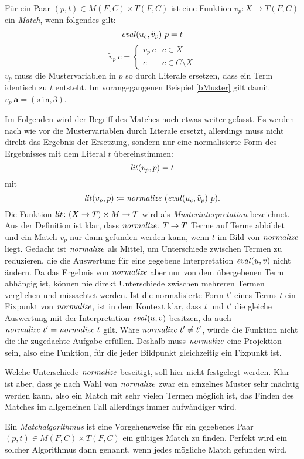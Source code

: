 \begin{definition}~\\ \label{defMatch}
Für ein Paar $(p, t) \in M(F, C) \times T(F, C)$ ist eine Funktion $v_p \colon X \rightarrow T(F, C)$ ein \emph{\Gls{Match}}, wenn folgendes gilt:
$$\mathit{eval}(u_c, \tilde v_p)~ p = t$$
$$\tilde v_p~ c = \begin{cases}
	v_p~ c & c \in X\\
	c      & c \in C \setminus X
\end{cases}$$
$v_p$ muss die Mustervariablen in $p$ so durch Literale ersetzen, dass ein Term identisch zu $t$ entsteht. 
Im vorangegangenen Beispiel \ref{bMuster} gilt damit $v_p~ \mathbf a = (\texttt{sin}, 3)$.

Im Folgenden wird der Begriff des Matches noch etwas weiter gefasst. Es werden nach wie vor die Mustervariablen durch Literale ersetzt, allerdings muss nicht direkt das Ergebnis der Ersetzung, sondern nur eine normalisierte Form des Ergebnisses mit dem Literal $t$ übereinstimmen:
$$\mathit{lit}(v_p, p)  = t$$
mit 
$$\mathit{lit}(v_p, p) \coloneqq \mathit{normalize}~(\mathit{eval}(u_c, \tilde v_p)~ p).$$
Die Funktion $\Const{lit} \colon \paren*{X \rightarrow T} \times M \rightarrow T$ wird als \emph{\Gls{Musterinterpretation}} bezeichnet.
Aus der Definition ist klar, dass $\mathit{normalize} \colon T \rightarrow T$ Terme auf Terme abbildet und ein Match $v_p$ nur dann gefunden werden kann, wenn $t$ im Bild von $\mathit{normalize}$ liegt. 
Gedacht ist $\mathit{normalize}$ als Mittel, um Unterschiede zwischen Termen zu reduzieren, die die Auswertung für eine gegebene Interpretation $\mathit{eval}(u, v)$ nicht ändern. Da das Ergebnis von $\mathit{normalize}$ aber nur von dem übergebenen Term abhängig ist, können nie direkt Unterschiede zwischen mehreren Termen verglichen und missachtet werden. Ist die normalisierte Form $t'$ eines Terms $t$ ein Fixpunkt von $\mathit{normalize}$, ist in dem Kontext klar, dass $t$ und $t'$ die gleiche Auswertung mit der Interpretation $\mathit{eval}(u, v)$ besitzen, da auch $\mathit{normalize}~t' = \mathit{normalize}~t$ gilt. Wäre $\mathit{normalize}~t' \neq t'$, würde die Funktion nicht die ihr zugedachte Aufgabe erfüllen. Deshalb muss $\mathit{normalize}$ eine Projektion sein, also eine Funktion, für die jeder Bildpunkt gleichzeitig ein Fixpunkt ist. 

Welche Unterschiede $\mathit{normalize}$ beseitigt, soll hier nicht festgelegt werden. Klar ist aber, dass je nach Wahl von $\mathit{normalize}$ zwar ein einzelnes Muster sehr mächtig werden kann, also ein Match mit sehr vielen Termen möglich ist, das Finden des Matches im allgemeinen Fall allerdings immer aufwändiger wird. 

\end{definition}

Ein \emph{\Gls{Matchalgorithmus}} ist eine Vorgehensweise für ein gegebenes Paar {$(p, t) \in M(F, C) \times T(F, C)$} ein gültiges Match zu finden. Perfekt wird ein solcher Algorithmus dann genannt, wenn jedes mögliche Match gefunden wird.



